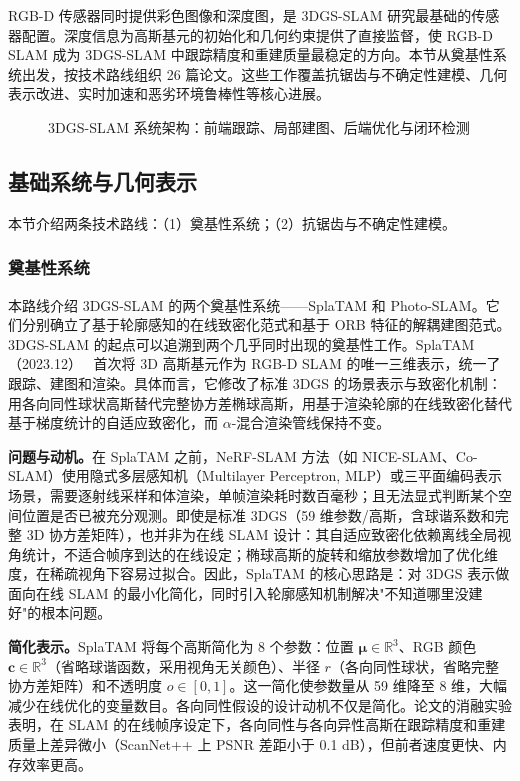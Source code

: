 RGB-D 传感器同时提供彩色图像和深度图，是 3DGS-SLAM 研究最基础的传感器配置。深度信息为高斯基元的初始化和几何约束提供了直接监督，使 RGB-D SLAM 成为 3DGS-SLAM 中跟踪精度和重建质量最稳定的方向。本节从奠基性系统出发，按技术路线组织 26 篇论文。这些工作覆盖抗锯齿与不确定性建模、几何表示改进、实时加速和恶劣环境鲁棒性等核心进展。

\begin{figure}[htbp]
\centering
\resizebox{\textwidth}{!}{}
\caption{3DGS-SLAM 系统架构：前端跟踪、局部建图、后端优化与闭环检测}
\label{fig:ch15_slam_system}
\end{figure}

\subsection{基础系统与几何表示}
\label{ss:15_1}

本节介绍两条技术路线：（1）奠基性系统；（2）抗锯齿与不确定性建模。

\subsubsection{奠基性系统}

本路线介绍 3DGS-SLAM 的两个奠基性系统——SplaTAM 和 Photo-SLAM。它们分别确立了基于轮廓感知的在线致密化范式和基于 ORB 特征的解耦建图范式。3DGS-SLAM 的起点可以追溯到两个几乎同时出现的奠基性工作。SplaTAM（2023.12）~\cite{2312_02126} 首次将 3D 高斯基元作为 RGB-D SLAM 的唯一三维表示，统一了跟踪、建图和渲染。具体而言，它修改了标准 3DGS 的场景表示与致密化机制：用各向同性球状高斯替代完整协方差椭球高斯，用基于渲染轮廓的在线致密化替代基于梯度统计的自适应致密化，而 $\alpha$-混合渲染管线保持不变。

\textbf{问题与动机。}在 SplaTAM 之前，NeRF-SLAM 方法（如 NICE-SLAM、Co-SLAM）使用隐式多层感知机（Multilayer Perceptron, MLP）或三平面编码表示场景，需要逐射线采样和体渲染，单帧渲染耗时数百毫秒；且无法显式判断某个空间位置是否已被充分观测。即使是标准 3DGS（59 维参数/高斯，含球谐系数和完整 3D 协方差矩阵），也并非为在线 SLAM 设计：其自适应致密化依赖离线全局视角统计，不适合帧序到达的在线设定；椭球高斯的旋转和缩放参数增加了优化维度，在稀疏视角下容易过拟合。因此，SplaTAM 的核心思路是：对 3DGS 表示做面向在线 SLAM 的最小化简化，同时引入轮廓感知机制解决"不知道哪里没建好"的根本问题。

\textbf{简化表示。}SplaTAM 将每个高斯简化为 8 个参数：位置 $\boldsymbol{\mu} \in \mathbb{R}^3$、RGB 颜色 $\mathbf{c} \in \mathbb{R}^3$（省略球谐函数，采用视角无关颜色）、半径 $r$（各向同性球状，省略完整协方差矩阵）和不透明度 $o \in [0,1]$。这一简化使参数量从 59 维降至 8 维，大幅减少在线优化的变量数目。各向同性假设的设计动机不仅是简化。论文的消融实验表明，在 SLAM 的在线帧序设定下，各向同性与各向异性高斯在跟踪精度和重建质量上差异微小（ScanNet++ 上 PSNR 差距小于 0.1 dB），但前者速度更快、内存效率更高。

